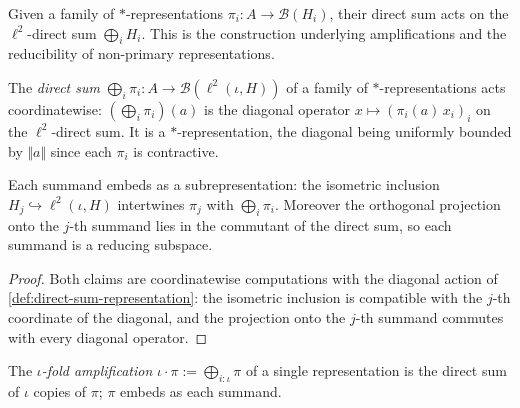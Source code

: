 Given a family of $*$-representations $\pi_i : A \to \mathcal{B}(H_i)$, their direct sum acts on the $\ell^2$-direct sum $\bigoplus_i H_i$. This is the construction underlying amplifications and the reducibility of non-primary representations.

\begin{definition}
    \label{def:direct-sum-representation}
    \leanok
    The \emph{direct sum} $\bigoplus_i \pi_i : A \to \mathcal{B}(\ell^2(\iota, H))$ of a family of $*$-representations acts coordinatewise: $(\bigoplus_i \pi_i)(a)$ is the diagonal operator $x \mapsto (\pi_i(a)\,x_i)_i$ on the $\ell^2$-direct sum. It is a $*$-representation, the diagonal being uniformly bounded by $\Vert a\Vert$ since each $\pi_i$ is contractive.
\end{definition}

\begin{theorem}
    \label{thrm:direct-sum-subrepresentation}
    \leanok
    Each summand embeds as a subrepresentation: the isometric inclusion $H_j \hookrightarrow \ell^2(\iota, H)$ intertwines $\pi_j$ with $\bigoplus_i \pi_i$. Moreover the orthogonal projection onto the $j$-th summand lies in the commutant of the direct sum, so each summand is a reducing subspace.
\end{theorem}
\begin{proof}
    \leanok
    Both claims are coordinatewise computations with the diagonal action of \ref{def:direct-sum-representation}: the isometric inclusion is compatible with the $j$-th coordinate of the diagonal, and the projection onto the $j$-th summand commutes with every diagonal operator.
\end{proof}

\begin{definition}[Amplification]
    \label{def:amplification}
    \leanok
    The \emph{$\iota$-fold amplification} $\iota \cdot \pi := \bigoplus_{i : \iota} \pi$ of a single representation is the direct sum of $\iota$ copies of $\pi$; $\pi$ embeds as each summand.
\end{definition}

